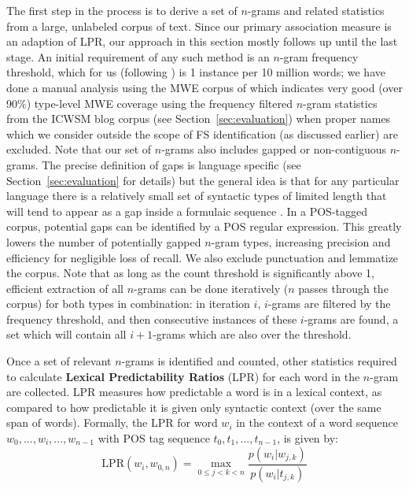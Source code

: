 \documentclass[11pt,letterpaper]{article}
\newcommand{\termdef}[1]{\textbf{#1}\xspace}
\newcommand{\LPR}{\ensuremath{\text{LPR}}}
\newcommand{\secref}[2][]{Section#1~\ref{#2}\xspace}
\begin{document}
The first step in the process is to derive a set of $n$-grams and related statistics from a large, unlabeled corpus of text. Since our primary association measure is an adaption of LPR, our approach in this section mostly follows  up until the last stage. An initial requirement of any such method is an $n$-gram frequency threshold, which for us (following ) is 1 instance per 10 million words; we have done a manual analysis using the MWE corpus of  which indicates very good (over 90\%) type-level MWE coverage using the frequency filtered $n$-gram statistics from the ICWSM blog corpus (see \secref{sec:evaluation}) when proper names which we consider outside the scope of FS identification (as discussed earlier) are excluded. 
Note that our set of $n$-grams also includes gapped or non-contiguous $n$-grams. The precise definition of gaps is language specific (see \secref{sec:evaluation} for details) but the general idea is that for any particular language there is a relatively small set of syntactic types of limited length that will tend to appear as a gap inside a formulaic sequence \cite{Wasow:2002}.
 In a POS-tagged corpus, potential gaps can be identified by a POS regular expression. This greatly lowers the number of potentially gapped $n$-gram types, increasing precision and efficiency for negligible loss of recall. We also exclude punctuation and lemmatize the corpus.  Note that as long as the count threshold is significantly above 1, efficient extraction of all $n$-grams can be done iteratively ($n$ passes through the corpus) for both types in combination: in iteration $i$, $i$-grams are filtered by the frequency threshold, and then consecutive instances of these $i$-grams are found, a set which will contain all $i+1$-grams which are also over the threshold. 

Once a set of relevant $n$-grams is identified and counted, other statistics required to calculate \termdef{Lexical Predictability Ratios} (LPR) for each word in the $n$-gram are collected. LPR measures how predictable a word is in a lexical context, as compared to how predictable it is given only syntactic context (over the same span of words). Formally, the LPR for word $w_i$ in the context of a word sequence $w_0,..., w_i, ..., w_{n-1}$ with POS tag sequence $t_0, t_1, ..., t_{n-1}$, is given by:
\begin{displaymath}
\LPR(w_i,w_{0,n}) = \max_{0 \leq j < k < n }{\frac{p(w_i|w_{j,k})}{p(w_i|t_{j,k})}}
\end{displaymath}
\end{document}
